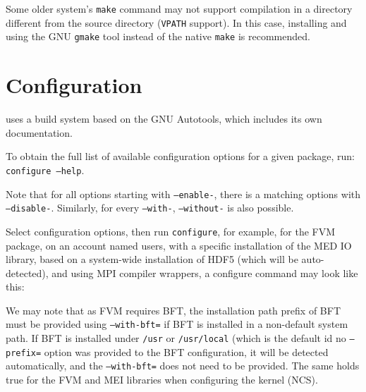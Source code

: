 \documentclass[a4paper,10pt,twoside]{article}
\begin{document}

Some older system's {\tt make} command may not support compilation
in a directory different from the source directory ({\tt VPATH}
support). In this case, installing and using the GNU {\tt gmake}
tool instead of the native {\tt make} is recommended. 

\section{Configuration\label{sec:config}}

\CS uses a build system based on the GNU Autotools, which includes
its own documentation.

To obtain the full list of available configuration options for a given
package, run: {\tt configure~--help}.

Note that for all options starting with {\tt --enable-}, 
there is a matching options with {\tt --disable-}. Similarly,
for every {\tt --with-}, {\tt --without-} is also possible.

Select configuration options, then run {\tt configure}, for example,
for the FVM package, on an account named users, with
a specific installation of the  MED IO library,
based on a system-wide installation of HDF5 (which will be auto-detected),
and using MPI compiler wrappers, a configure command may look like this:


We may note that as FVM requires BFT, the installation path
prefix of BFT must be provided using \texttt{--with-bft=}
if BFT is installed in a non-default system path. If BFT is installed
under \texttt{/usr} or \texttt{/usr/local} (which is the default
id no \texttt{--prefix=} option was provided to the BFT configuration,
it will be detected automatically, and the \texttt{--with-bft=}
does not need to be provided. The same holds true for the FVM
and MEI libraries when configuring the \CS kernel (NCS).
\end{document}
